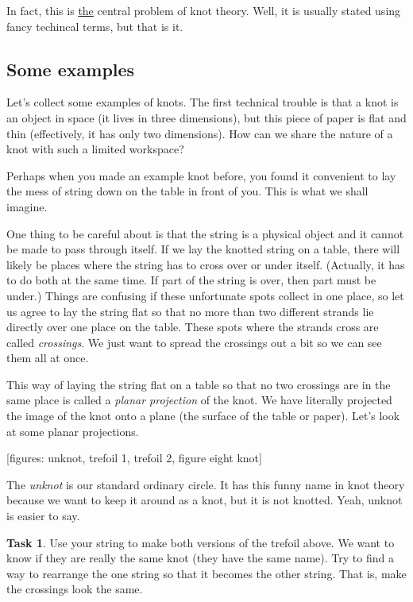 \documentclass[12pt,letterpaper]{article}
\theoremstyle{definition}
\newtheorem{task}[question]{Task}
\begin{document}
In fact, this is \underline{the} central problem of knot theory.
Well, it is usually stated using fancy techincal terms, but that is it.

\subsection*{Some examples}

Let's collect some examples of knots. 
The first technical trouble is that a knot is an object in space (it lives in three dimensions), but this piece of paper is flat and thin  (effectively, it has only two dimensions).
How can we share the nature of a knot with such a limited workspace?

Perhaps when you made an example knot before, you found it convenient to lay the mess of string down on the table in front of you.
This is what we shall imagine.

One thing to be careful about is that the string is a physical object and it cannot be made to pass through itself.
If we lay the knotted string on a table, there will likely be places where the string has to cross over or under itself. 
(Actually, it has to do both at the same time. 
If part of the string is over, then part must be under.)
Things are confusing if these unfortunate spots collect in one place, so let us agree to lay the string flat so that no more than two different strands lie directly over one place on the table. 
These spots where the strands cross are called \emph{crossings}.
We just want to spread the crossings out a bit so we can see them all at once.

This way of laying the string flat on a table so that no two crossings are in the same place is called a \emph{planar projection} of the knot.
We have literally projected the image of the knot onto a plane (the surface of the table or paper). Let's look at some planar projections.

[figures: unknot, trefoil 1, trefoil 2, figure eight knot]

The \emph{unknot} is our standard ordinary circle.
It has this funny name in knot theory because we want to keep it around as a knot, but it is not knotted.
Yeah, unknot is easier to say.

\begin{task}
Use your string to make both versions of the trefoil above. 
We want to know if they are really the same knot (they have the same name).
Try to find a way to rearrange the one string so that it becomes the other string.
That is, make the crossings look the same.
\end{task}
\end{document}

